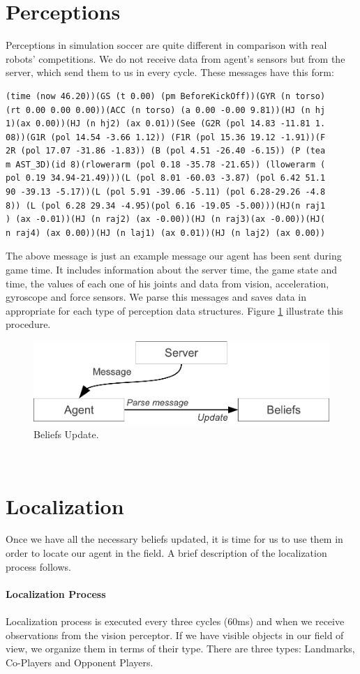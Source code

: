 \section{Perceptions}
Perceptions in simulation soccer are quite different in comparison with real robots' competitions. We do not receive data from agent's sensors but from the server, which send them to us in every cycle. These messages have this form:\\
\begin{verbatim}
(time (now 46.20))(GS (t 0.00) (pm BeforeKickOff))(GYR (n torso)
(rt 0.00 0.00 0.00))(ACC (n torso) (a 0.00 -0.00 9.81))(HJ (n hj
1)(ax 0.00))(HJ (n hj2) (ax 0.01))(See (G2R (pol 14.83 -11.81 1.
08))(G1R (pol 14.54 -3.66 1.12)) (F1R (pol 15.36 19.12 -1.91))(F
2R (pol 17.07 -31.86 -1.83)) (B (pol 4.51 -26.40 -6.15)) (P (tea
m AST_3D)(id 8)(rlowerarm (pol 0.18 -35.78 -21.65)) (llowerarm (
pol 0.19 34.94-21.49)))(L (pol 8.01 -60.03 -3.87) (pol 6.42 51.1
90 -39.13 -5.17))(L (pol 5.91 -39.06 -5.11) (pol 6.28-29.26 -4.8
8)) (L (pol 6.28 29.34 -4.95)(pol 6.16 -19.05 -5.00)))(HJ(n raj1
) (ax -0.01))(HJ (n raj2) (ax -0.00))(HJ (n raj3)(ax -0.00))(HJ(
n raj4) (ax 0.00))(HJ (n laj1) (ax 0.01))(HJ (n laj2) (ax 0.00))
\end{verbatim}
The above message is just an example message our agent has been sent 
during game time. It includes information about the server time, the game state and time, the values of each one of his joints and data from vision, acceleration, gyroscope and force sensors. We parse this messages and saves data in appropriate for each type of perception data structures. Figure \ref{fig:BeliefsUpdate} illustrate this procedure.
\begin{figure}[htb!]
\centering
  \includegraphics[scale=0.6]{Chapter3/figures/Message.pdf}
  \caption{Beliefs Update.} 
  \label{fig:BeliefsUpdate}
\end{figure}
\\


\section{Localization}
Once we have all the necessary beliefs updated, it is time for us to use them in order to locate our agent in the field. A brief description of the localization process follows.\\
\\
{\bf Localization Process}\\
\\
Localization process is executed every three cycles (60ms) and when we receive observations from the vision perceptor. If we have visible objects in our field of view, we organize them in terms of their type. There are three types: Landmarks, Co-Players and Opponent Players. 


